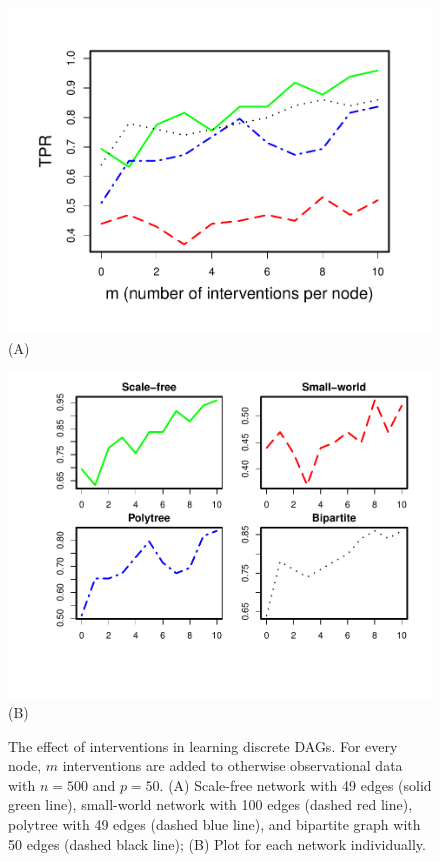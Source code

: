 \documentclass[article]{jss}
\renewcommand{\|}{\,|\,}
\begin{document}
\begin{figure}[t!]
\centering
\begin{minipage}[b]{0.45\linewidth}
\centering
\includegraphics[width=1\linewidth]{3_A_discrete.pdf} \\
(A)
\end{minipage}
\begin{minipage}[b]{0.45\linewidth}
\centering
\includegraphics[width=1.1\linewidth]{3_B_discrete.pdf} \\
(B)
\end{minipage}
\caption{The effect of interventions in learning discrete DAGs. For every node, $m$ interventions are added to otherwise observational data with $n = 500$ and $p = 50$. (A) Scale-free network with 49 edges (solid green line), small-world network with 100 edges (dashed red line), polytree with 49 edges (dashed blue line), and bipartite graph with 50 edges (dashed black line); (B) Plot for each network individually.
}
\label{fig:intervene-all}
\end{figure}
\end{document}
